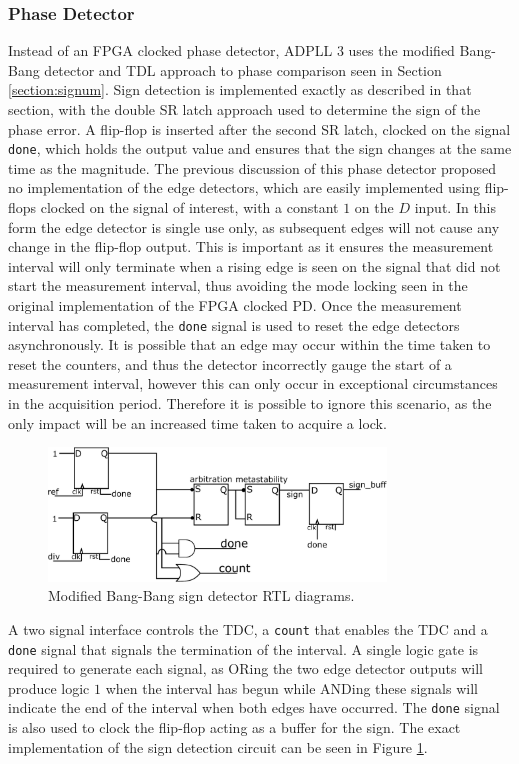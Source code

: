 \subsubsection{Phase Detector}
Instead of an \ac{FPGA} clocked phase detector, \ac{ADPLL} 3 uses the modified Bang-Bang detector and \ac{TDL} approach to phase comparison seen in Section \ref{section:signum}. Sign detection is implemented exactly as described in that section, with the double \ac{SR} latch approach used to determine the sign of the phase error. A flip-flop is inserted after the second \ac{SR} latch, clocked on the signal \texttt{done}, which holds the output value and ensures that the sign changes at the same time as the magnitude. The previous discussion of this phase detector proposed no implementation of the edge detectors, which are easily implemented using flip-flops clocked on the signal of interest, with a constant $1$ on the $D$ input. In this form the edge detector is single use only, as subsequent edges will not cause any change in the flip-flop output. This is important as it ensures the measurement interval will only terminate when a rising edge is seen on the signal that did not start the measurement interval, thus avoiding the mode locking seen in the original implementation of the \ac{FPGA} clocked \ac{PD}. Once the measurement interval has completed, the \texttt{done} signal is used to reset the edge detectors asynchronously. It is possible that an edge may occur within the time taken to reset the counters, and thus the detector incorrectly gauge the start of a measurement interval, however this can only occur in exceptional circumstances in the acquisition period. Therefore it is possible to ignore this scenario, as the only impact will be an increased time taken to acquire a lock.
\begin{figure}[h]
	\centering
	\includegraphics[width=0.8\textwidth]{../new_pdet1}
	\caption[Modified Bang-Bang sign detector RTL diagrams]{Modified Bang-Bang sign detector RTL diagrams.}
	\label{fig:signdet_impl}
\end{figure}

A two signal interface controls the \ac{TDC}, a \texttt{count} that enables the \ac{TDC} and a \texttt{done} signal that signals the termination of the interval. A single logic gate is required to generate each signal, as ORing the two edge detector outputs will produce logic $1$ when the interval has begun while ANDing these signals will indicate the end of the interval when both edges have occurred. The \texttt{done} signal is also used to clock the flip-flop acting as a buffer for the sign. The exact implementation of the sign detection circuit can be seen in Figure \ref{fig:signdet_impl}.

